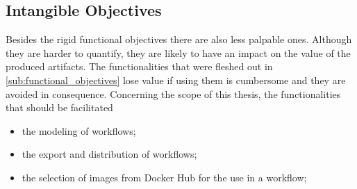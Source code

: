 
\subsection{Intangible Objectives} %
  \label{sub:intangible_objectives}

  Besides the rigid functional objectives there are also less palpable ones. Although they are harder to quantify, they are likely to have an impact on the value of the produced artifacts. The functionalities that were fleshed out in \ref{sub:functional_objectives} lose value if using them is cumbersome and they are avoided in consequence. Concerning the scope of this thesis, the functionalities that should be facilitated
  \begin{itemize}
    \item the modeling of workflows;
    \item the export and distribution of workflows;
    \item the selection of images from Docker Hub for the use in a workflow;
  \end{itemize}
